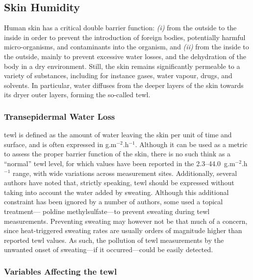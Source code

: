 \subsection{Skin Humidity}\label{sect:tcco2:skin_mes:rh}

Human skin has a critical double barrier function: \emph{(i)} from the outside to the inside in order to prevent the introduction of foreign bodies, potentially harmful micro-organisms, and contaminants into the organism, and \emph{(ii)} from the inside to the outside, mainly to prevent excessive water losses, and the dehydration of the body in a dry environment\cite{ehrhardt2008}. Still, the skin remains significantly permeable to a variety of substances, including for instance gases, water vapour, drugs, and solvents\cite{scheuplein1976, schaefer1982}. In particular, water diffuses from the deeper layers of the skin towards its dryer outer layers, forming the so-called \gls{tewl}.

\subsubsection{Transepidermal Water Loss}\label{subsect:tcco2:tewl}

\gls{tewl} is defined as the amount of water leaving the skin per unit of time and surface, and is often expressed in g.m$^{-2}$.h$^{-1}$. Although it can be used as a metric to assess the proper barrier function of the skin\cite{montero2021}, there is no such think as a \enquote{normal} \gls{tewl} level, for which values have been reported in the 2.3--44.0~g.m$^{-2}$.h$^{-1}$ range, with wide variations across measurement sites\cite{kottner2013, akdeniz2018}. Additionally, several authors have noted that, strictly speaking, \gls{tewl} should be expressed without taking into account the water added by sweating\cite{rogiers2001, fluhr2004bioengineering}. Although this additional constraint has been ignored by a number of authors, some used a topical treatment---\eg{} poldine methylsulfate---to prevent sweating during \gls{tewl} measurements\cite{grice1972}. Preventing sweating may however not be that much of a concern, since heat-triggered sweating rates are usually orders of magnitude higher than reported \gls{tewl} values\cite{cheuvront2009}. As such, the pollution of \gls{tewl} measurements by the unwanted onset of sweating---if it occurred---could be easily detected.

\subsubsection{Variables Affecting the \texorpdfstring{\gls{tewl}}{TEWL}}


